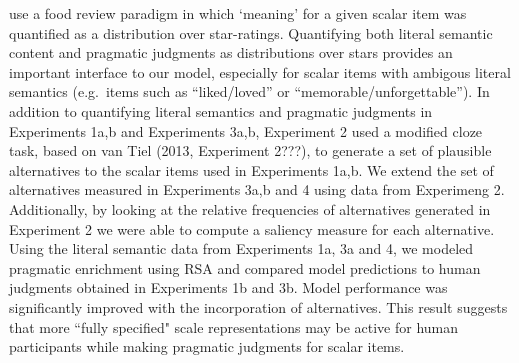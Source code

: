 \documentclass[10pt, letterpaper]{article}
\begin{document}
use a food review paradigm in which `meaning' for a given scalar item
was quantified as a distribution over star-ratings. Quantifying both
literal semantic content and pragmatic judgments as distributions over
stars provides an important interface to our model, especially for
scalar items with ambigous literal semantics (e.g.~items such as
``liked/loved'' or ``memorable/unforgettable''). In addition to
quantifying literal semantics and pragmatic judgments in Experiments
1a,b and Experiments 3a,b, Experiment 2 used a modified cloze task,
based on van Tiel (2013, Experiment 2???), to generate a set of
plausible alternatives to the scalar items used in Experiments 1a,b. We
extend the set of alternatives measured in Experiments 3a,b and 4 using
data from Experimeng 2. Additionally, by looking at the relative
frequencies of alternatives generated in Experiment 2 we were able to
compute a saliency measure for each alternative. Using the literal
semantic data from Experiments 1a, 3a and 4, we modeled pragmatic
enrichment using RSA and compared model predictions to human judgments
obtained in Experiments 1b and 3b. Model performance was significantly
improved with the incorporation of alternatives. This result suggests
that more ``fully specified" scale representations may be active for
human participants while making pragmatic judgments for scalar items.
\end{document}

